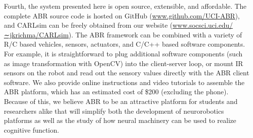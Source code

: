 Fourth, the system presented here is open source, extensible,
and affordable. The complete \ac{ABR} source code is hosted on
GitHub (\url{www.github.com/UCI-ABR}), and CARLsim 
can be freely obtained from our website 
(\url{www.socsci.uci.edu/∼jkrichma/CARLsim}). 
The \ac{ABR} framework can be combined with
a variety of R/C based vehicles, sensors, actuators, and C/C++ based
software components. For example, it is straightforward to plug
additional software components (such as image transformation
with OpenCV) into the client-server loop, or mount IR sensors
on the robot and read out the sensory values directly with the
\ac{ABR} client software. We also provide online instructions and video
tutorials to assemble the \ac{ABR} platform, which has an estimated
cost of \$200 (excluding the phone). Because of this, we believe \ac{ABR}
to be an attractive platform for students and researchers alike that
will simplify both the development of neurorobotics platforms as
well as the study of how neural machinery can be used to realize
cognitive function.
